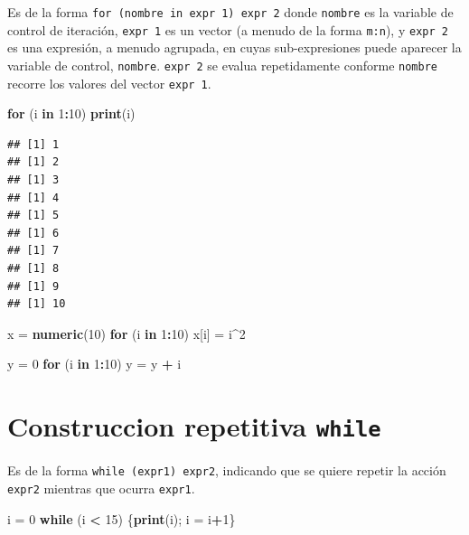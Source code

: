 \documentclass[]{book}
\newenvironment{Shaded}{\begin{snugshade}}{\end{snugshade}}
\newcommand{\KeywordTok}[1]{\textcolor[rgb]{0.13,0.29,0.53}{\textbf{#1}}}
\newcommand{\DecValTok}[1]{\textcolor[rgb]{0.00,0.00,0.81}{#1}}
\newcommand{\StringTok}[1]{\textcolor[rgb]{0.31,0.60,0.02}{#1}}
\newcommand{\ControlFlowTok}[1]{\textcolor[rgb]{0.13,0.29,0.53}{\textbf{#1}}}
\newcommand{\OperatorTok}[1]{\textcolor[rgb]{0.81,0.36,0.00}{\textbf{#1}}}
\newcommand{\NormalTok}[1]{#1}
\begin{document}
Es de la forma \texttt{for\ (nombre\ in\ expr\ 1)\ expr\ 2} donde
\texttt{nombre} es la variable de control de iteración, \texttt{expr\ 1}
es un vector (a menudo de la forma \texttt{m:n}), y \texttt{expr\ 2} es
una expresión, a menudo agrupada, en cuyas sub-expresiones puede
aparecer la variable de control, \texttt{nombre}. \texttt{expr\ 2} se
evalua repetidamente conforme \texttt{nombre} recorre los valores del
vector \texttt{expr\ 1}.

\begin{Shaded}
\begin{Highlighting}[]
\ControlFlowTok{for}\NormalTok{ (i }\ControlFlowTok{in} \DecValTok{1}\OperatorTok{:}\DecValTok{10}\NormalTok{) }\KeywordTok{print}\NormalTok{(i)}
\end{Highlighting}
\end{Shaded}

\begin{verbatim}
## [1] 1
## [1] 2
## [1] 3
## [1] 4
## [1] 5
## [1] 6
## [1] 7
## [1] 8
## [1] 9
## [1] 10
\end{verbatim}

\begin{Shaded}
\begin{Highlighting}[]
\NormalTok{x =}\StringTok{ }\KeywordTok{numeric}\NormalTok{(}\DecValTok{10}\NormalTok{)}
\ControlFlowTok{for}\NormalTok{ (i }\ControlFlowTok{in} \DecValTok{1}\OperatorTok{:}\DecValTok{10}\NormalTok{) x[i] =}\StringTok{ }\NormalTok{i}\OperatorTok{^}\DecValTok{2}

\NormalTok{y =}\StringTok{ }\DecValTok{0}
\ControlFlowTok{for}\NormalTok{ (i }\ControlFlowTok{in} \DecValTok{1}\OperatorTok{:}\DecValTok{10}\NormalTok{) y =}\StringTok{ }\NormalTok{y }\OperatorTok{+}\StringTok{ }\NormalTok{i}
\end{Highlighting}
\end{Shaded}

\hypertarget{construccion-repetitiva-while}{%
\section{\texorpdfstring{Construccion repetitiva
\texttt{while}}{Construccion repetitiva while}}\label{construccion-repetitiva-while}}

Es de la forma \texttt{while\ (expr1)\ expr2}, indicando que se quiere
repetir la acción \texttt{expr2} mientras que ocurra \texttt{expr1}.

\begin{Shaded}
\begin{Highlighting}[]
\NormalTok{i =}\StringTok{ }\DecValTok{0}
\ControlFlowTok{while}\NormalTok{ (i }\OperatorTok{<}\StringTok{ }\DecValTok{15}\NormalTok{) \{}\KeywordTok{print}\NormalTok{(i); i =}\StringTok{ }\NormalTok{i}\OperatorTok{+}\DecValTok{1}\NormalTok{\}}
\end{Highlighting}
\end{Shaded}
\end{document}
